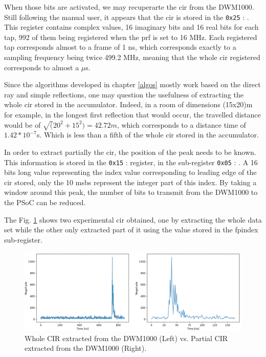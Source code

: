 When those bits are activated, we may recuperarte the \gls{cir} from the DWM1000. Still following the manual user, it appears that the \gls{cir} is stored in the \texttt{0x25} :  . This register contains complex values, 16 imaginary bits and 16 real bits for each tap, 992 of them being registered when the \gls{prf} is set to 16 MHz. Each registered tap corresponds almost to a frame of 1 ns, which corresponds exactly to a sampling frequency  being twice 499.2 MHz, meaning that the whole \gls{cir} registered corresponds to almost a $\mu$s.
\vspace{2mm}

Since the algorithms developed in chapter \ref{algos} mostly work based on the direct ray and simple reflections, one may question the usefulness of extracting the whole \gls{cir} stored in the accumulator. Indeed, in a room of dimensions (15x20)m for example, in the longest first reflection that would occur, the travelled distance would be of $\sqrt(20^2 + 15^2) = 42.72m$, which corresponds to a distance time of $1.42*10^{-7}$s. Which is less than a fifth of the whole \gls{cir} stored in the accumulator.
\vspace{2mm}

In order to extract partially the \gls{cir}, the position of the peak needs to be known. This information is stored in the \texttt{0x15} :  register, in the sub-register \texttt{0x05} :  . A 16 bits long value representing the index value corresponding to leading edge of the \gls{cir} stored, only the 10 \glspl{msb} represent the integer part of this index. By taking a window around this peak, the number of bits to transmit from the DWM1000 to the PSoC can be reduced.
\vspace{2mm}

The Fig. \ref{fig:cir_long_short} shows two experimental \gls{cir} obtained, one by extracting the whole data set while the other only extracted part of it using the value stored in the \gls{fpindex} sub-register.

\begin{figure}[H]
\centering
\includegraphics[width=\linewidth]{Images/extracted_cir.png}
\caption{Whole CIR extracted from the DWM1000 (Left) vs. Partial CIR extracted from the DWM1000 (Right). \label{fig:cir_long_short}}
\end{figure}

